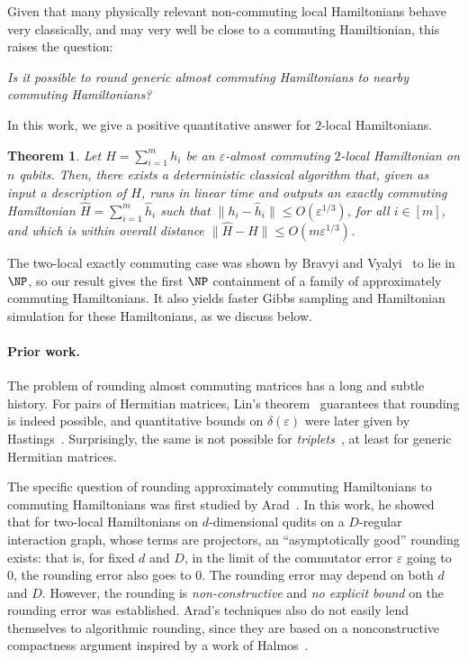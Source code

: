 \documentclass[11pt]{article}
\theoremstyle{plain}
\newtheorem*{theorem*}{Theorem}
\newcommand{\eps}{\varepsilon}
\begin{document}
Given that many physically relevant non-commuting local Hamiltonians behave very classically, and may very well be close to a commuting Hamiltionian, this raises the question:
\begin{center}
\emph{Is it possible to round generic almost commuting Hamiltonians
to nearby commuting Hamiltonians?}
\end{center}
In this work, we give a positive quantitative answer for $2$-local Hamiltonians.
\begin{theorem*}
Let $H=\sum_{i=1}^m h_i$ be an $\eps$-almost commuting $2$-local 
Hamiltonian on $n$ qubits. Then, there exists a deterministic classical algorithm that, given as input a description of $H$, runs 
in linear time and outputs an exactly commuting Hamiltonian $\hat{H}=\sum_{i=1}^m 
\hat{h}_i$ such that $\|h_i - \hat{h}_i\| \leq O(\eps^{1/3})$, for all
$i \in [m]$, and which is within overall distance 
$\|\hat{H} - H\| \leq O(m \eps^{1/3})$.
\end{theorem*}

The two-local exactly commuting case was shown by Bravyi and Vyalyi~\cite{bravyi2004commutativeversionklocalhamiltonian} to lie in $\NP$, so our result gives the first $\NP$ containment of a family of approximately commuting Hamiltonians. It also yields faster Gibbs sampling and Hamiltonian simulation for these Hamiltonians, as we discuss below.



\paragraph{Prior work.}
The problem of rounding almost commuting matrices has a long and subtle history.  For pairs of 
Hermitian matrices, Lin's theorem~\cite{Lin1997} guarantees that rounding is indeed possible, and
quantitative bounds on $\delta(\eps)$ were later given by Hastings~\cite{Hastings_2009,herrera2022hastingsapproachlinstheorem}.  
Surprisingly, the same is not possible for \emph{triplets}~\cite{Davidson1985,Hastings_2010}, at least for generic Hermitian matrices.

The specific question of rounding approximately commuting Hamiltonians to commuting Hamiltonians was first studied by Arad~\cite{arad2011notepartialnogotheorem}. In this work, he showed that for two-local Hamiltonians on $d$-dimensional qudits on a $D$-regular interaction graph, whose terms are projectors, an ``asymptotically good'' rounding exists: that is, for fixed $d$ and $D$, in the limit of the commutator error $\eps$ going to $0$, the rounding error also goes to $0$. The rounding error may depend on both $d$ and $D$.  However, the rounding is \emph{non-constructive} and \emph{no explicit bound} on the rounding error was established. Arad's techniques also do not easily lend themselves to algorithmic rounding, since they are based on a nonconstructive compactness argument inspired by a work of Halmos~\cite{halmos1976some}.
\end{document}
